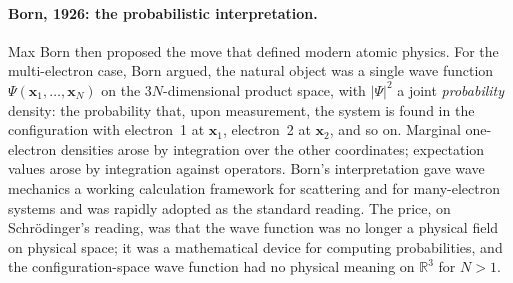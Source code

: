 \paragraph{Born, 1926: the probabilistic interpretation.}
Max Born then proposed the move that defined modern atomic physics. For the multi-electron case, Born argued, the natural object was a single wave function $\Psi(\mathbf{x}_1, \ldots, \mathbf{x}_N)$ on the $3N$-dimensional product space, with $|\Psi|^2$ a joint \emph{probability} density: the probability that, upon measurement, the system is found in the configuration with electron~1 at $\mathbf{x}_1$, electron~2 at $\mathbf{x}_2$, and so on. Marginal one-electron densities arose by integration over the other coordinates; expectation values arose by integration against operators. Born's interpretation gave wave mechanics a working calculation framework for scattering and for many-electron systems and was rapidly adopted as the standard reading. The price, on Schr\"odinger's reading, was that the wave function was no longer a physical field on physical space; it was a mathematical device for computing probabilities, and the configuration-space wave function had no physical meaning on $\mathbb{R}^3$ for $N > 1$.

